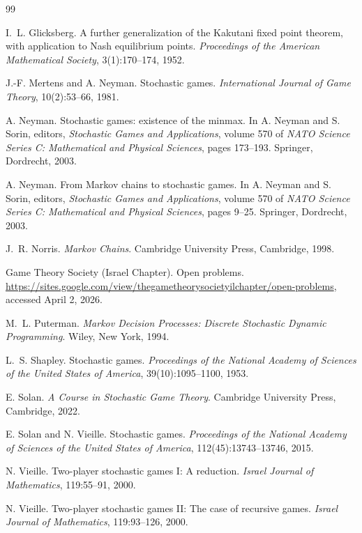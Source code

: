 \documentclass[11pt]{article}
\theoremstyle{definition}
\newcommand{\1}{\mathbf{1}}
\begin{document}
\begin{thebibliography}{99}

I.~L. Glicksberg.
\newblock A further generalization of the Kakutani fixed point theorem, with application to Nash equilibrium points.
\newblock \emph{Proceedings of the American Mathematical Society}, 3(1):170--174, 1952.

J.-F. Mertens and A. Neyman.
\newblock Stochastic games.
\newblock \emph{International Journal of Game Theory}, 10(2):53--66, 1981.

A. Neyman.
\newblock Stochastic games: existence of the minmax.
\newblock In A. Neyman and S. Sorin, editors, \emph{Stochastic Games and Applications}, volume 570 of \emph{NATO Science Series C: Mathematical and Physical Sciences}, pages 173--193. Springer, Dordrecht, 2003.

A. Neyman.
\newblock From Markov chains to stochastic games.
\newblock In A. Neyman and S. Sorin, editors, \emph{Stochastic Games and Applications}, volume 570 of \emph{NATO Science Series C: Mathematical and Physical Sciences}, pages 9--25. Springer, Dordrecht, 2003.

J.~R. Norris.
\newblock \emph{Markov Chains}.
\newblock Cambridge University Press, Cambridge, 1998.

Game Theory Society (Israel Chapter).
\newblock Open problems.
\newblock \url{https://sites.google.com/view/thegametheorysocietyilchapter/open-problems}, accessed April 2, 2026.

M.~L. Puterman.
\newblock \emph{Markov Decision Processes: Discrete Stochastic Dynamic Programming}.
\newblock Wiley, New York, 1994.

L.~S. Shapley.
\newblock Stochastic games.
\newblock \emph{Proceedings of the National Academy of Sciences of the United States of America}, 39(10):1095--1100, 1953.

E. Solan.
\newblock \emph{A Course in Stochastic Game Theory}.
\newblock Cambridge University Press, Cambridge, 2022.

E. Solan and N. Vieille.
\newblock Stochastic games.
\newblock \emph{Proceedings of the National Academy of Sciences of the United States of America}, 112(45):13743--13746, 2015.

N. Vieille.
\newblock Two-player stochastic games {I}: A reduction.
\newblock \emph{Israel Journal of Mathematics}, 119:55--91, 2000.

N. Vieille.
\newblock Two-player stochastic games {II}: The case of recursive games.
\newblock \emph{Israel Journal of Mathematics}, 119:93--126, 2000.

\end{thebibliography}
\end{document}
